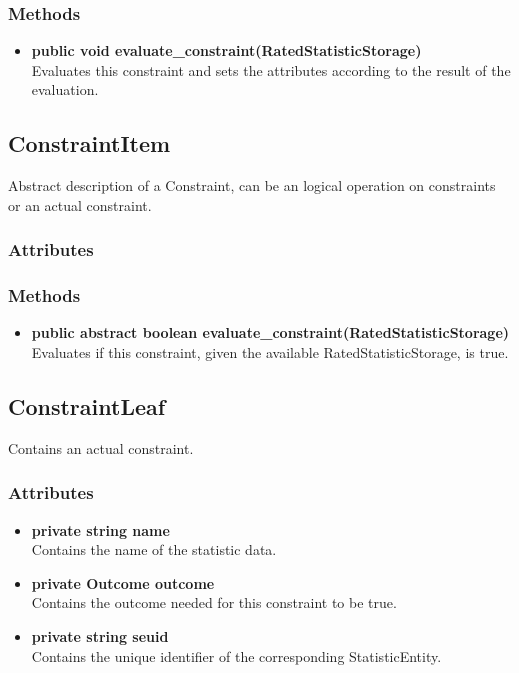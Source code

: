 \subsubsection{Methods}
\begin{itemize}
	\item \textbf{ public void evaluate\_constraint(RatedStatisticStorage)  }\\
	Evaluates this constraint and sets the attributes according to the result of the evaluation.
\end{itemize}



\subsection{ConstraintItem}
	Abstract description of a Constraint, can be an logical operation on constraints or an actual constraint.
\subsubsection{Attributes}
\subsubsection{Methods}
\begin{itemize}
	\item \textbf{ public abstract boolean evaluate\_constraint(RatedStatisticStorage) }\\
	Evaluates if this constraint, given the available RatedStatisticStorage, is true. 
\end{itemize}		


\subsection{ConstraintLeaf }
Contains an actual constraint.

\subsubsection{Attributes}
\begin{itemize}
	\item \textbf{ private string name }\\
	Contains the name of the statistic data.
	\item \textbf{ private Outcome outcome }\\
	Contains the outcome needed for this constraint to be true.
	\item \textbf{ private string seuid }\\
	Contains the unique identifier of the corresponding StatisticEntity.
\end{itemize}
